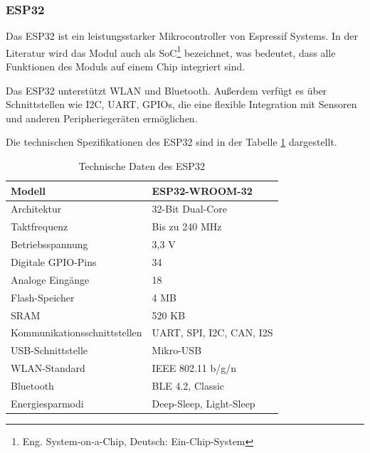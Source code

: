 \documentclass[12pt, letterpaper]{article}
\begin{document}
  \subsubsection{ESP32}
  \par Das ESP32 ist ein leistungsstarker Mikrocontroller von Espressif Systems. In der Literatur wird das Modul auch als SoC\footnote{Eng. System-on-a-Chip, Deutsch: Ein-Chip-System} bezeichnet, was bedeutet, dass alle Funktionen des Moduls auf einem Chip integriert sind.
  \par Das ESP32 unterstützt WLAN und Bluetooth. Außerdem verfügt es über Schnittstellen wie I2C, UART, GPIOs, die eine flexible Integration mit Sensoren und anderen Peripheriegeräten ermöglichen.
  \par Die technischen Spezifikationen des ESP32 sind in der Tabelle \ref{tab:esp32td} dargestellt.

    \begin{table}[h]
    \centering
    \begin{tabular}{|l|l|}
    \hline
    Modell & ESP32-WROOM-32 \\ \hline
    Architektur & 32-Bit Dual-Core \\ \hline
    Taktfrequenz & Bis zu 240 MHz \\ \hline
    Betriebsspannung & 3,3 V \\ \hline
    Digitale GPIO-Pins & 34 \\ \hline
    Analoge Eingänge & 18 \\ \hline
    Flash-Speicher & 4 MB \\ \hline
    SRAM & 520 KB \\ \hline
    Kommunikationsschnittstellen & UART, SPI, I2C, CAN, I2S \\ \hline
    USB-Schnittstelle & Mikro-USB \\ \hline
    WLAN-Standard & IEEE 802.11 b/g/n \\ \hline
    Bluetooth & BLE 4.2, Classic \\ \hline
    Energiesparmodi & Deep-Sleep, Light-Sleep \\ \hline
    \end{tabular}
    \caption{Technische Daten des ESP32}
    \label{tab:esp32td}
    \end{table}
\end{document}
